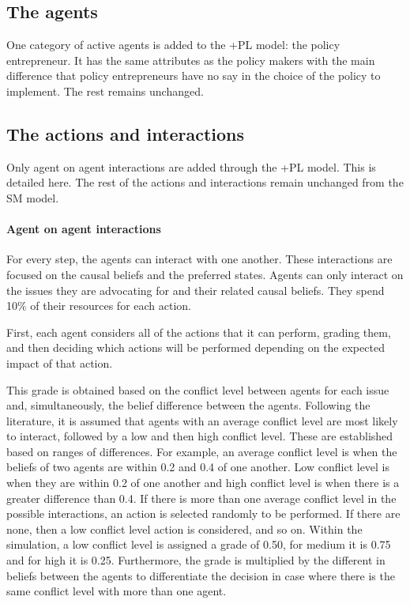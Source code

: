\documentclass[11pt]{article}
\begin{document}

\subsection{The agents}

One category of active agents is added to the +PL model: the policy entrepreneur. It has the same attributes as the policy makers with the main difference that policy entrepreneurs have no say in the choice of the policy to implement. The rest remains unchanged.



\subsection{The actions and interactions}


Only agent on agent interactions are added through the +PL model. This is detailed here. The rest of the actions and interactions remain unchanged from the SM model.

\paragraph{Agent on agent interactions}

For every step, the agents can interact with one another. These interactions are focused on the causal beliefs and the preferred states. Agents can only interact on the issues they are advocating for and their related causal beliefs. They spend 10\% of their resources for each action.


First, each agent considers all of the actions that it can perform, grading them, and then deciding which actions will be performed depending on the expected impact of that action.

This grade is obtained based on the conflict level between agents for each issue and, simultaneously, the belief difference between the agents. Following the literature, it is assumed that agents with an average conflict level are most likely to interact, followed by a low and then high conflict level. These are established based on ranges of differences. For example, an average conflict level is when the beliefs of two agents are within 0.2 and 0.4 of one another. Low conflict level is when they are within 0.2 of one another and high conflict level is when there is a greater difference than 0.4. If there is more than one average conflict level in the possible interactions, an action is selected randomly to be performed. If there are none, then a low conflict level action is considered, and so on. Within the simulation, a low conflict level is assigned a grade of 0.50, for medium it is 0.75 and for high it is 0.25. Furthermore, the grade is multiplied by the different in beliefs between the agents to differentiate the decision in case where there is the same conflict level with more than one agent.
\end{document}
